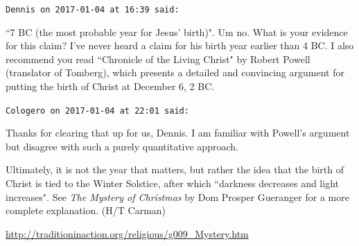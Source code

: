 \begin{footnotesize}\begin{sffamily}



\texttt{Dennis on 2017-01-04 at 16:39 said: }

``7 BC (the most probable year for Jesus' birth)". Um no. What is your evidence for this claim? I've never heard a claim for his birth year earlier than 4 BC. I also recommend you read ``Chronicle of the Living Christ" by Robert Powell (translator of Tomberg), which presents a detailed and convincing argument for putting the birth of Christ at December 6, 2 BC.


\hfill

\texttt{Cologero on 2017-01-04 at 22:01 said: }

Thanks for clearing that up for us, Dennis. I am familiar with Powell's argument but disagree with such a purely quantitative approach.

Ultimately, it is not the year that matters, but rather the idea that the birth of Christ is tied to the Winter Solstice, after which ``darkness decreases and light increases". See \textit{The Mystery of Christmas} by Dom Prosper Gueranger for a more complete explanation. (H/T Carman)

\url{http://traditioninaction.org/religious/g009_Mystery.htm}

\end{sffamily}\end{footnotesize}
